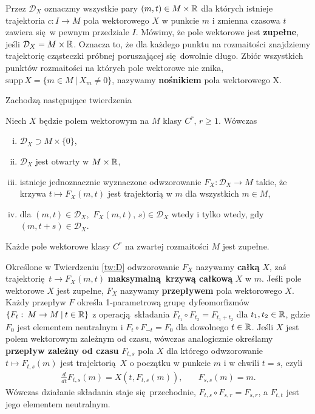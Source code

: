 Przez \(\mathcal{D}_X\) oznaczmy wszystkie pary \((m, t)\in M \times \mathbb{R}\) dla których istnieje trajektoria \(c: I\rightarrow M\) pola wektorowego \(X\) w punkcie \(m\) i zmienna czasowa \(t\) zawiera się w pewnym przedziale \(I\). Mówimy, że pole wektorowe jest \textbf{zupełne}, jeśli \(\mathcal{D}_X = M \times \mathbb{R}\). Oznacza to, że dla każdego punktu na rozmaitości znajdziemy trajektorię cząsteczki próbnej poruszającej się dowolnie długo. Zbiór wszystkich punktów rozmaitości na których pole wektorowe nie znika, \(\mathrm{supp}\,X=\{m\in M\:|\: X_m\neq 0\}\), nazywamy \textbf{nośnikiem} pola wektorowego X. 

Zachodzą następujące twierdzenia
\begin{twierdzenie}\label{tw:D}
Niech \(X\) będzie polem wektorowym na \(M\) klasy \(C^r,\, r\geq1\). Wówczas
\begin{enumerate}[i)]
\item \(\mathcal{D}_X\supset M\times \{0\}\),
\item \(\mathcal{D}_X\) jest otwarty w \(M\times \mathbb{R}\),
\item istnieje jednoznacznie wyznaczone odwzorowanie \(F_X:\mathcal{D}_X\rightarrow M\) takie, że krzywa \(t\mapsto F_X(m,t)\) jest trajektorią w \(m\) dla wszystkich \(m\in M\),
\item dla \((m,t)\in \mathcal{D}_X,\) \(F_X(m,t),\, s)\in\mathcal{D}_X\) wtedy i tylko wtedy, gdy \((m, t+s)\in \mathcal{D}_X\).
\end{enumerate}
\end{twierdzenie}  

\begin{twierdzenie}
Każde pole wektorowe klasy \(C^r\) na zwartej rozmaitości \(M\) jest zupełne.
\end{twierdzenie}

Określone w Twierdzeniu \ref{tw:D} odwzorowanie \(F_X\) nazywamy \textbf{całką} \(X\), zaś trajektorię \(t\rightarrow F_X(m,t)\) \textbf{maksymalną krzywą całkową} \(X\) w \(m\). Jeśli pole wektorowe \(X\) jest zupełne, \(F_X\) nazywamy \textbf{przepływem} pola wektorowego \(X\). Każdy przepływ \(F\) określa 1-parametrową grupę dyfeomorfizmów \(\{F_t:\:M\rightarrow M\:|\: t\in \mathbb{R}\}\) z operacją składania \(F_{t_1}\circ F_{t_2} = F_{t_1 + t_2}\) dla \(t_{1}, {t}_2 \in \mathbb{R}\), gdzie \(F_0\) jest elementem neutralnym i \(F_{t}\circ F_{-t} = F_{0}\) dla dowolnego \(t\in\mathbb{R}\). Jeśli \(X\) jest polem wektorowym zależnym od czasu, wówczas analogicznie określamy \textbf{przepływ zależny od czasu} \(F_{t,s}\) pola \(X\) dla którego odwzorowanie \(t\mapsto F_{t,s}(m)\) jest trajektorią \(X\) o początku w punkcie \(m\) i w chwili \(t=s\), czyli
\begin{align}
\frac{d}{dt}F_{t,s}(m) = X\left(t, F_{t,s}(m)\right), &\quad F_{s,s}(m) = m.
\end{align} 
Wówczas działanie składania staje się przechodnie, \(F_{t,s}\circ F_{s,r} = F_{s, r}\), a \(F_{t, t}\) jest jego elementem neutralnym. 

